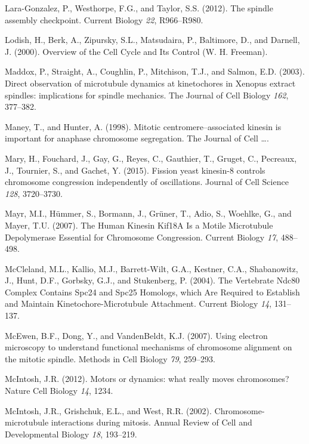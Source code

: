 \documentclass[12pt,a4paper,twoside,openright]{book}
\begin{document}
\hypertarget{ref-Lara-Gonzalez2012}{}
Lara-Gonzalez, P., Westhorpe, F.G., and Taylor, S.S. (2012). The spindle
assembly checkpoint. Current Biology \emph{22}, R966--R980.

\hypertarget{ref-Lodish2000}{}
Lodish, H., Berk, A., Zipursky, S.L., Matsudaira, P., Baltimore, D., and
Darnell, J. (2000). Overview of the Cell Cycle and Its Control (W. H.
Freeman).

\hypertarget{ref-Maddox2003}{}
Maddox, P., Straight, A., Coughlin, P., Mitchison, T.J., and Salmon,
E.D. (2003). Direct observation of microtubule dynamics at kinetochores
in Xenopus extract spindles: implications for spindle mechanics. The
Journal of Cell Biology \emph{162}, 377--382.

\hypertarget{ref-Maney1998}{}
Maney, T., and Hunter, A. (1998). Mitotic centromere--associated kinesin
is important for anaphase chromosome segregation. The Journal of Cell
\ldots{}.

\hypertarget{ref-Mary2015}{}
Mary, H., Fouchard, J., Gay, G., Reyes, C., Gauthier, T., Gruget, C.,
Pecreaux, J., Tournier, S., and Gachet, Y. (2015). Fission yeast
kinesin-8 controls chromosome congression independently of oscillations.
Journal of Cell Science \emph{128}, 3720--3730.

\hypertarget{ref-Mayr2007}{}
Mayr, M.I., Hümmer, S., Bormann, J., Grüner, T., Adio, S., Woehlke, G.,
and Mayer, T.U. (2007). The Human Kinesin Kif18A Is a Motile Microtubule
Depolymerase Essential for Chromosome Congression. Current Biology
\emph{17}, 488--498.

\hypertarget{ref-McCleland2004}{}
McCleland, M.L., Kallio, M.J., Barrett-Wilt, G.A., Kestner, C.A.,
Shabanowitz, J., Hunt, D.F., Gorbsky, G.J., and Stukenberg, P. (2004).
The Vertebrate Ndc80 Complex Contains Spc24 and Spc25 Homologs, which
Are Required to Establish and Maintain Kinetochore-Microtubule
Attachment. Current Biology \emph{14}, 131--137.

\hypertarget{ref-McEwen2007}{}
McEwen, B.F., Dong, Y., and VandenBeldt, K.J. (2007). Using electron
microscopy to understand functional mechanisms of chromosome alignment
on the mitotic spindle. Methods in Cell Biology \emph{79}, 259--293.

\hypertarget{ref-McIntosh2012}{}
McIntosh, J.R. (2012). Motors or dynamics: what really moves
chromosomes? Nature Cell Biology \emph{14}, 1234.

\hypertarget{ref-McIntosh2002b}{}
McIntosh, J.R., Grishchuk, E.L., and West, R.R. (2002).
Chromosome-microtubule interactions during mitosis. Annual Review of
Cell and Developmental Biology \emph{18}, 193--219.
\end{document}
